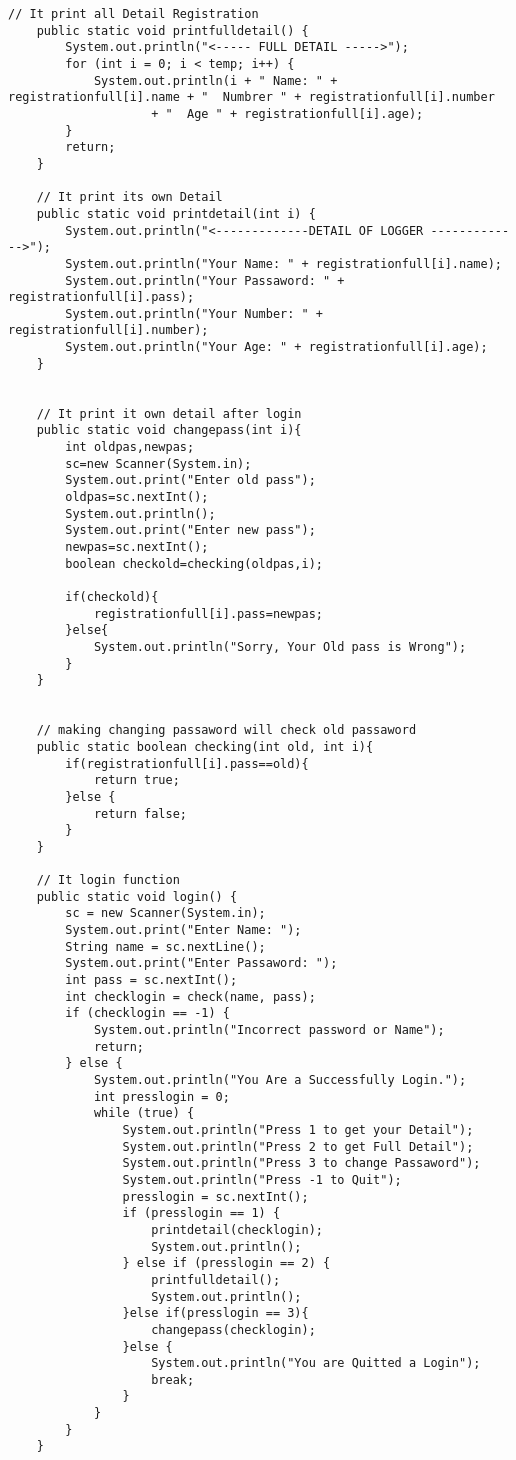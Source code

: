 \documentclass[12pt]{article}
\begin{document}
\begin{lstlisting}[]
    // It print all Detail Registration
    public static void printfulldetail() {
        System.out.println("<----- FULL DETAIL ----->");
        for (int i = 0; i < temp; i++) {
            System.out.println(i + " Name: " + registrationfull[i].name + "  Numbrer " + registrationfull[i].number
                    + "  Age " + registrationfull[i].age);
        }
        return;
    }

    // It print its own Detail
    public static void printdetail(int i) {
        System.out.println("<-------------DETAIL OF LOGGER ------------->");
        System.out.println("Your Name: " + registrationfull[i].name);
        System.out.println("Your Passaword: " + registrationfull[i].pass);
        System.out.println("Your Number: " + registrationfull[i].number);
        System.out.println("Your Age: " + registrationfull[i].age);
    }


    // It print it own detail after login
    public static void changepass(int i){
        int oldpas,newpas;
        sc=new Scanner(System.in);
        System.out.print("Enter old pass");
        oldpas=sc.nextInt();
        System.out.println();
        System.out.print("Enter new pass");
        newpas=sc.nextInt();
        boolean checkold=checking(oldpas,i);

        if(checkold){
            registrationfull[i].pass=newpas;
        }else{
            System.out.println("Sorry, Your Old pass is Wrong");
        }
    }


    // making changing passaword will check old passaword
    public static boolean checking(int old, int i){
        if(registrationfull[i].pass==old){
            return true;
        }else {
            return false;
        }
    }

    // It login function
    public static void login() {
        sc = new Scanner(System.in);
        System.out.print("Enter Name: ");
        String name = sc.nextLine();
        System.out.print("Enter Passaword: ");
        int pass = sc.nextInt();
        int checklogin = check(name, pass);
        if (checklogin == -1) {
            System.out.println("Incorrect password or Name");
            return;
        } else {
            System.out.println("You Are a Successfully Login.");
            int presslogin = 0;
            while (true) {
                System.out.println("Press 1 to get your Detail");
                System.out.println("Press 2 to get Full Detail");
                System.out.println("Press 3 to change Passaword");
                System.out.println("Press -1 to Quit");
                presslogin = sc.nextInt();
                if (presslogin == 1) {
                    printdetail(checklogin);
                    System.out.println();
                } else if (presslogin == 2) {
                    printfulldetail();
                    System.out.println();
                }else if(presslogin == 3){
                    changepass(checklogin);
                }else {
                    System.out.println("You are Quitted a Login");
                    break;
                }
            }
        }
    }


\end{lstlisting}
\end{document}
